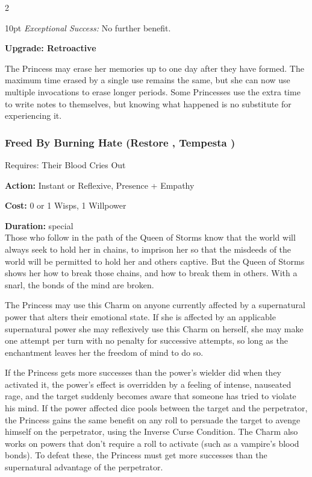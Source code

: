 \begin{multicols}{2}
\begin{myindentpar}{10pt}
    \emph{Exceptional Success:} No further benefit.

\textbf{Upgrade: Retroactive}

The Princess may erase her memories up to one day after they have formed. The maximum time erased by a single use remains the same, but she can now use multiple invocations to erase longer periods. Some Princesses use the extra time to write notes to themselves, but knowing what happened is no substitute for experiencing it.\end{myindentpar}

\subsubsection*{Freed By Burning Hate (Restore \textbullet\textbullet\textbullet, Tempesta \textbullet\textbullet\textbullet)}

\noindent Requires: Their Blood Cries Out

\noindent \textbf{Action:} Instant or Reflexive, Presence + Empathy

\noindent \textbf{Cost:} 0 or 1 Wisps, 1 Willpower

\noindent \textbf{Duration:} special \\

\noindent Those who follow in the path of the Queen of Storms know that the world will always seek to hold her in chains, to imprison her so that the misdeeds of the world will be permitted to hold her and others captive. But the Queen of Storms shows her how to break those chains, and how to break them in others. With a snarl, the bonds of the mind are broken.

The Princess may use this Charm on anyone currently affected by a supernatural power that alters their emotional state. If she is affected by an applicable supernatural power she may reflexively use this Charm on herself, she may make one attempt per turn with no penalty for successive attempts, so long as the enchantment leaves her the freedom of mind to do so.

If the Princess gets more successes than the power's wielder did when they activated it, the power's effect is overridden by a feeling of intense, nauseated rage, and the target suddenly becomes aware that someone has tried to violate his mind. If the power affected dice pools between the target and the perpetrator, the Princess gains the same benefit on any roll to persuade the target to avenge himself on the perpetrator, using the Inverse Curse Condition. The Charm also works on powers that don't require a roll to activate (such as a vampire's blood bonds). To defeat these, the Princess must get more successes than the supernatural advantage of the perpetrator.


\end{multicols}
